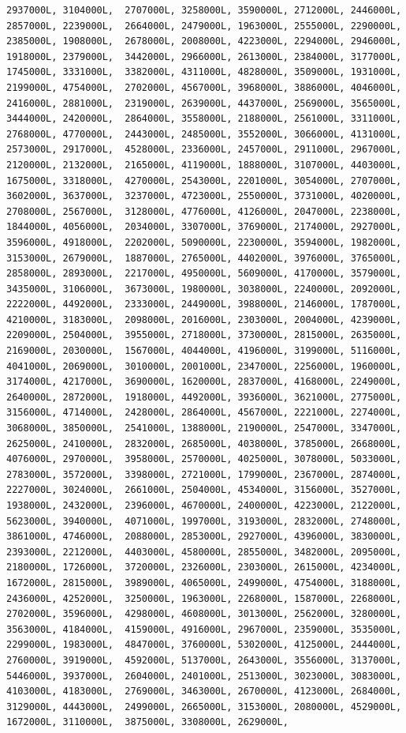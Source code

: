 \documentclass[
]{article}
\begin{document}
\begin{verbatim}
2937000L, 3104000L,  2707000L, 3258000L, 3590000L, 2712000L, 2446000L, 2857000L, 2239000L,  2664000L, 2479000L, 1963000L, 2555000L, 2290000L, 2385000L, 1908000L,  2678000L, 2008000L, 4223000L, 2294000L, 2946000L, 1918000L, 2379000L,  3442000L, 2966000L, 2613000L, 2384000L, 3177000L, 1745000L, 3331000L,  3382000L, 4311000L, 4828000L, 3509000L, 1931000L, 2199000L, 4754000L,  2702000L, 4567000L, 3968000L, 3886000L, 4046000L, 2416000L, 2881000L,  2319000L, 2639000L, 4437000L, 2569000L, 3565000L, 3444000L, 2420000L,  2864000L, 3558000L, 2188000L, 2561000L, 3311000L, 2768000L, 4770000L,  2443000L, 2485000L, 3552000L, 3066000L, 4131000L, 2573000L, 2917000L,  4528000L, 2336000L, 2457000L, 2911000L, 2967000L, 2120000L, 2132000L,  2165000L, 4119000L, 1888000L, 3107000L, 4403000L, 1675000L, 3318000L,  4270000L, 2543000L, 2201000L, 3054000L, 2707000L, 3602000L, 3637000L,  3237000L, 4723000L, 2550000L, 3731000L, 4020000L, 2708000L, 2567000L,  3128000L, 4776000L, 4126000L, 2047000L, 2238000L, 1844000L, 4056000L,  2034000L, 3307000L, 3769000L, 2174000L, 2927000L, 3596000L, 4918000L,  2202000L, 5090000L, 2230000L, 3594000L, 1982000L, 3153000L, 2679000L,  1887000L, 2765000L, 4402000L, 3976000L, 3765000L, 2858000L, 2893000L,  2217000L, 4950000L, 5609000L, 4170000L, 3579000L, 3435000L, 3106000L,  3673000L, 1980000L, 3038000L, 2240000L, 2092000L, 2222000L, 4492000L,  2333000L, 2449000L, 3988000L, 2146000L, 1787000L, 4210000L, 3183000L,  2098000L, 2016000L, 2303000L, 2004000L, 4239000L, 2209000L, 2504000L,  3955000L, 2718000L, 3730000L, 2815000L, 2635000L, 2169000L, 2030000L,  1567000L, 4044000L, 4196000L, 3199000L, 5116000L, 4041000L, 2069000L,  3010000L, 2001000L, 2347000L, 2256000L, 1960000L, 3174000L, 4217000L,  3690000L, 1620000L, 2837000L, 4168000L, 2249000L, 2640000L, 2872000L,  1918000L, 4492000L, 3936000L, 3621000L, 2775000L, 3156000L, 4714000L,  2428000L, 2864000L, 4567000L, 2221000L, 2274000L, 3068000L, 3850000L,  2541000L, 1388000L, 2190000L, 2547000L, 3347000L, 2625000L, 2410000L,  2832000L, 2685000L, 4038000L, 3785000L, 2668000L, 4076000L, 2970000L,  3958000L, 2570000L, 4025000L, 3078000L, 5033000L, 2783000L, 3572000L,  3398000L, 2721000L, 1799000L, 2367000L, 2874000L, 2227000L, 3024000L,  2661000L, 2504000L, 4534000L, 3156000L, 3527000L, 1938000L, 2432000L,  2396000L, 4670000L, 2400000L, 4223000L, 2122000L, 5623000L, 3940000L,  4071000L, 1997000L, 3193000L, 2832000L, 2748000L, 3861000L, 4746000L,  2088000L, 2853000L, 2927000L, 4396000L, 3830000L, 2393000L, 2212000L,  4403000L, 4580000L, 2855000L, 3482000L, 2095000L, 2180000L, 1726000L,  3720000L, 2326000L, 2303000L, 2615000L, 4234000L, 1672000L, 2815000L,  3989000L, 4065000L, 2499000L, 4754000L, 3188000L, 2436000L, 4252000L,  3250000L, 1963000L, 2268000L, 1587000L, 2268000L, 2702000L, 3596000L,  4298000L, 4608000L, 3013000L, 2562000L, 3280000L, 3563000L, 4184000L,  4159000L, 4916000L, 2967000L, 2359000L, 3535000L, 2299000L, 1983000L,  4847000L, 3760000L, 5302000L, 4125000L, 2444000L, 2760000L, 3919000L,  4592000L, 5137000L, 2643000L, 3556000L, 3137000L, 5446000L, 3937000L,  2604000L, 2401000L, 2513000L, 3023000L, 3083000L, 4103000L, 4183000L,  2769000L, 3463000L, 2670000L, 4123000L, 2684000L, 3129000L, 4443000L,  2499000L, 2665000L, 3153000L, 2080000L, 4529000L, 1672000L, 3110000L,  3875000L, 3308000L, 2629000L, 
\end{verbatim}
\end{document}
